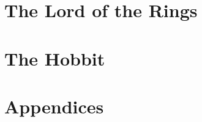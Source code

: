 \cleardoublepage %

\cleardoublepage


\cleardoublepage %


\part{The Lord of the Rings}



\cleardoublepage


\part{The Hobbit} 



\cleardoublepage



% 



\appendix

\part{Appendices} %

